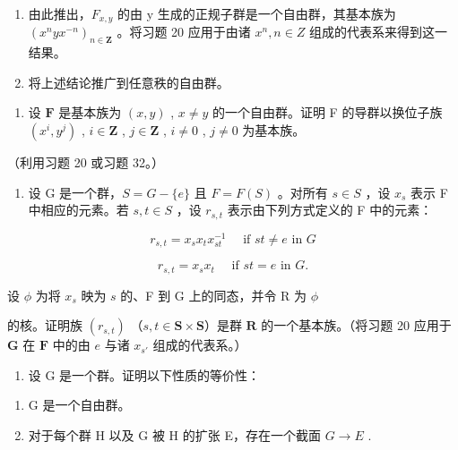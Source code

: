 \begin{enumerate}
\def\labelenumi{(\alph{enumi})}
\setcounter{enumi}{1}
\item
  由此推出，\(F_{x,y}\) 的由 y 生成的正规子群是一个自由群，其基本族为 \((x^{n}yx^{-n})_{n\in\mathbf{Z}}\) 。将习题 20 应用于由诸 \(x^{n}, n\in Z\) 组成的代表系来得到这一结果。
\item
  将上述结论推广到任意秩的自由群。
\end{enumerate}

\begin{enumerate}
\def\labelenumi{\arabic{enumi}.}
\setcounter{enumi}{22}
\tightlist
\item
  设 \(\mathbf{F}\) 是基本族为 \((x, y)\) , \(x \neq y\) 的一个自由群。证明 F 的导群以换位子族 \((x^i, y^j)\) , \(i \in \mathbf{Z}\) , \(j \in \mathbf{Z}\) , \(i \neq 0\) , \(j \neq 0\) 为基本族。
\end{enumerate}

（利用习题 20 或习题 32。）

\begin{enumerate}
\def\labelenumi{\arabic{enumi}.}
\setcounter{enumi}{23}
\tightlist
\item
  设 G 是一个群，\(S = G - \{e\}\) 且 \(F = F(S)\) 。对所有 \(s \in S\) ，设 \(x_s\) 表示 F 中相应的元素。若 \(s, t \in S\) ，设 \(r_{s,t}\) 表示由下列方式定义的 F 中的元素：
\end{enumerate}

\[
r _ {s, t} = x _ {s} x _ {t} x _ {s t} ^ {- 1} \quad \text { if } s t \neq e \text { in } G
\]

\[
r _ {s, t} = x _ {s} x _ {t} \quad \text { if } s t = e \text { in } G.
\]

设 \(\phi\) 为将 \(x_{s}\) 映为 \(s\) 的、F 到 G 上的同态，并令 R 为 \(\phi\)

的核。证明族 \((r_{s,t})\) （\(s, t \in \mathbf{S} \times \mathbf{S}\)）是群 \(\mathbf{R}\) 的一个基本族。（将习题 20 应用于 \(\mathbf{G}\) 在 \(\mathbf{F}\) 中的由 \(e\) 与诸 \(x_{s'}\) 组成的代表系。）

\begin{enumerate}
\def\labelenumi{\arabic{enumi}.}
\setcounter{enumi}{24}
\tightlist
\item
  设 G 是一个群。证明以下性质的等价性：
\end{enumerate}

\begin{enumerate}
\def\labelenumi{(\alph{enumi})}
\item
  G 是一个自由群。
\item
  对于每个群 H 以及 G 被 H 的扩张 E，存在一个截面 \(G \rightarrow E\) .
\end{enumerate}

